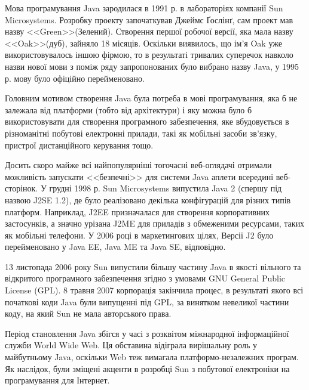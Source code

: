 \par Мова програмування Java зародилася в 1991 р. в лабораторіях компанії Sun Microsystems. Розробку проекту започаткував Джеймс Ґослінґ, сам проект мав назву <<Green>>(Зелений). Створення першої робочої версії, яка мала назву <<Oak>>(дуб), зайняло 18 місяців. Оскільки виявилось, що ім'я Oak уже використовувалось іншою фірмою, то в результаті тривалих суперечок навколо назви нової мови з поміж ряду запропонованих було вибрано назву Java, у 1995 р. мову було офіційно перейменовано.
\par Головним мотивом створення Java була потреба в мові програмування, яка б не залежала від платформи (тобто від архітектури) і яку можна було б використовувати для створення програмного забезпечення, яке вбудовується в різноманітні побутові електронні прилади, такі як мобільні засоби зв'язку, пристрої дистанційного керування тощо.
\par Досить скоро майже всі найпопулярніші тогочасні веб-оглядачі отримали можливість запускати <<безпечні>> для системи Java аплети всередині веб-сторінок. У грудні 1998 р. Sun Microsystems випустила Java 2 (спершу під назвою J2SE 1.2), де було реалізовано декілька конфігурацій для різних типів платформ. Наприклад, J2EE призначалася для створення корпоративних застосунків, а значно урізана J2ME для приладів з обмеженими ресурсами, таких як мобільні телефони. У 2006 році в маркетингових цілях, Версії J2 було перейменовано у Java EE, Java ME та Java SE, відповідно.
\par 13 листопада 2006 року Sun випустили більшу частину Java в якості вільного та відкритого програмного забезпечення згідно з умовами GNU General Public License (GPL). 8 травня 2007 корпорація закінчила процес, в результаті якого всі початкові коди Java були випущенні під GPL, за винятком невеликої частини коду, на який Sun не мала авторського права.
\par Період становлення Java збігся у часі з розквітом міжнародної інформаційної служби World Wide Web. Ця обставина відіграла вирішальну роль у майбутньому Java, оскільки Web теж вимагала платформо-незалежних програм. Як наслідок, були зміщені акценти в розробці Sun з побутової електроніки на програмування для Інтернет.

